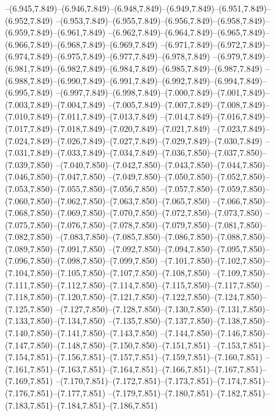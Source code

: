   --(6.945,7.849)--(6.946,7.849)--(6.948,7.849)--(6.949,7.849)--(6.951,7.849)--(6.952,7.849)%
  --(6.953,7.849)--(6.955,7.849)--(6.956,7.849)--(6.958,7.849)--(6.959,7.849)--(6.961,7.849)%
  --(6.962,7.849)--(6.964,7.849)--(6.965,7.849)--(6.966,7.849)--(6.968,7.849)--(6.969,7.849)%
  --(6.971,7.849)--(6.972,7.849)--(6.974,7.849)--(6.975,7.849)--(6.977,7.849)--(6.978,7.849)%
  --(6.979,7.849)--(6.981,7.849)--(6.982,7.849)--(6.984,7.849)--(6.985,7.849)--(6.987,7.849)%
  --(6.988,7.849)--(6.990,7.849)--(6.991,7.849)--(6.992,7.849)--(6.994,7.849)--(6.995,7.849)%
  --(6.997,7.849)--(6.998,7.849)--(7.000,7.849)--(7.001,7.849)--(7.003,7.849)--(7.004,7.849)%
  --(7.005,7.849)--(7.007,7.849)--(7.008,7.849)--(7.010,7.849)--(7.011,7.849)--(7.013,7.849)%
  --(7.014,7.849)--(7.016,7.849)--(7.017,7.849)--(7.018,7.849)--(7.020,7.849)--(7.021,7.849)%
  --(7.023,7.849)--(7.024,7.849)--(7.026,7.849)--(7.027,7.849)--(7.029,7.849)--(7.030,7.849)%
  --(7.031,7.849)--(7.033,7.849)--(7.034,7.849)--(7.036,7.850)--(7.037,7.850)--(7.039,7.850)%
  --(7.040,7.850)--(7.042,7.850)--(7.043,7.850)--(7.044,7.850)--(7.046,7.850)--(7.047,7.850)%
  --(7.049,7.850)--(7.050,7.850)--(7.052,7.850)--(7.053,7.850)--(7.055,7.850)--(7.056,7.850)%
  --(7.057,7.850)--(7.059,7.850)--(7.060,7.850)--(7.062,7.850)--(7.063,7.850)--(7.065,7.850)%
  --(7.066,7.850)--(7.068,7.850)--(7.069,7.850)--(7.070,7.850)--(7.072,7.850)--(7.073,7.850)%
  --(7.075,7.850)--(7.076,7.850)--(7.078,7.850)--(7.079,7.850)--(7.081,7.850)--(7.082,7.850)%
  --(7.083,7.850)--(7.085,7.850)--(7.086,7.850)--(7.088,7.850)--(7.089,7.850)--(7.091,7.850)%
  --(7.092,7.850)--(7.094,7.850)--(7.095,7.850)--(7.096,7.850)--(7.098,7.850)--(7.099,7.850)%
  --(7.101,7.850)--(7.102,7.850)--(7.104,7.850)--(7.105,7.850)--(7.107,7.850)--(7.108,7.850)%
  --(7.109,7.850)--(7.111,7.850)--(7.112,7.850)--(7.114,7.850)--(7.115,7.850)--(7.117,7.850)%
  --(7.118,7.850)--(7.120,7.850)--(7.121,7.850)--(7.122,7.850)--(7.124,7.850)--(7.125,7.850)%
  --(7.127,7.850)--(7.128,7.850)--(7.130,7.850)--(7.131,7.850)--(7.133,7.850)--(7.134,7.850)%
  --(7.135,7.850)--(7.137,7.850)--(7.138,7.850)--(7.140,7.850)--(7.141,7.850)--(7.143,7.850)%
  --(7.144,7.850)--(7.146,7.850)--(7.147,7.850)--(7.148,7.850)--(7.150,7.850)--(7.151,7.851)%
  --(7.153,7.851)--(7.154,7.851)--(7.156,7.851)--(7.157,7.851)--(7.159,7.851)--(7.160,7.851)%
  --(7.161,7.851)--(7.163,7.851)--(7.164,7.851)--(7.166,7.851)--(7.167,7.851)--(7.169,7.851)%
  --(7.170,7.851)--(7.172,7.851)--(7.173,7.851)--(7.174,7.851)--(7.176,7.851)--(7.177,7.851)%
  --(7.179,7.851)--(7.180,7.851)--(7.182,7.851)--(7.183,7.851)--(7.184,7.851)--(7.186,7.851)%
